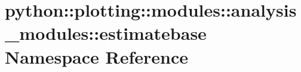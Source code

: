 \hypertarget{namespacepython_1_1plotting_1_1modules_1_1analysis__modules_1_1estimatebase}{
\section{python::plotting::modules::analysis\_\-modules::estimatebase Namespace Reference}
\label{namespacepython_1_1plotting_1_1modules_1_1analysis__modules_1_1estimatebase}
}
